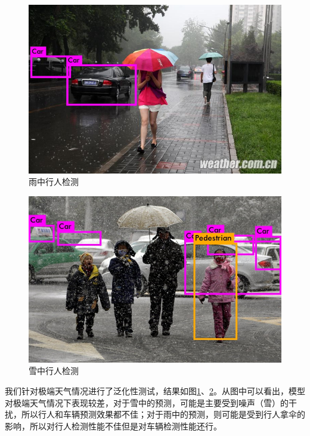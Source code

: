 {	\begin{figure}[htbp]
	\centering
	\includegraphics[width=5in]{images/rain.jpg}
	\caption{雨中行人检测}
	\label{rain}
	\end{figure}
	\begin{figure}[htbp]
	\centering
	\includegraphics[width=5in]{images/snow.jpg}
	\caption{雪中行人检测}
	\label{snow}
	\end{figure}
	我们针对极端天气情况进行了泛化性测试，结果如图\ref{rain}、\ref{snow}。从图中可以看出，模型对极端天气情况下表现较差，对于雪中的预测，可能是主要受到噪声（雪）的干扰，所以行人和车辆预测效果都不佳；对于雨中的预测，则可能是受到行人拿伞的影响，所以对行人检测性能不佳但是对车辆检测性能还行。

}

